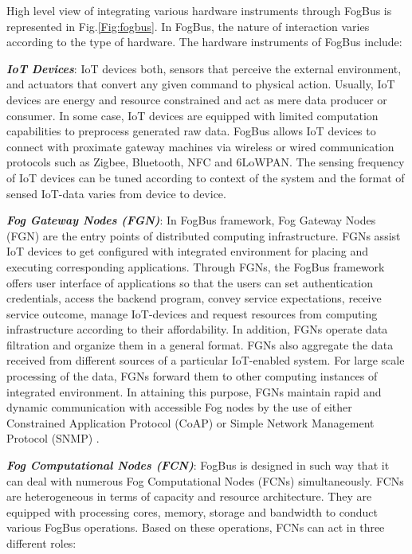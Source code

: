 \documentclass[final,5p,times,twocolumn]{elsarticle}
\begin{document}
%
High level view of integrating various hardware instruments through FogBus is represented in Fig.\ref{Fig:fogbus}. In FogBus, the nature of interaction varies according to the type of hardware. The hardware instruments of FogBus include:
\par \textbf{\textit{IoT Devices}}: IoT devices both, sensors that perceive the external environment, and actuators that convert any given command to physical action. Usually, IoT devices are energy and resource constrained and act as mere data producer or consumer. In some case, IoT devices are equipped with limited computation capabilities to preprocess generated raw data. FogBus allows IoT devices to connect with proximate gateway machines via wireless or wired communication protocols such as Zigbee, Bluetooth, NFC and 6LoWPAN. The sensing frequency of IoT devices can be tuned according to context of the system and the format of sensed IoT-data varies from device to device.     
%  
\par \textbf{\textit{Fog Gateway Nodes (FGN)}}: In FogBus framework, Fog Gateway Nodes (FGN) are the entry points of distributed computing infrastructure. FGNs assist IoT devices to get configured with integrated environment for placing and executing corresponding applications. Through FGNs, the FogBus framework offers user interface of applications so that the users can set authentication credentials, access the backend program, convey service expectations, receive service outcome, manage IoT-devices and request resources from computing infrastructure according to their affordability. In addition, FGNs operate data filtration and organize them in a general format. FGNs also aggregate the data received from different sources of a particular IoT-enabled system. For large scale processing of the data, FGNs forward them to other computing instances of integrated environment. In attaining this purpose, FGNs maintain rapid and dynamic communication with accessible Fog nodes by the use of either Constrained Application Protocol (CoAP) or Simple Network Management Protocol (SNMP) \cite{protocols}.   
%    
\par \textbf{\textit{Fog Computational Nodes (FCN)}}: FogBus is designed in such way that it can deal with numerous Fog Computational Nodes (FCNs) simultaneously. FCNs are heterogeneous in terms of capacity and resource architecture. They are equipped with processing cores, memory, storage and bandwidth to conduct various FogBus operations. Based on these operations, FCNs can act in three different roles:       
\end{document}
